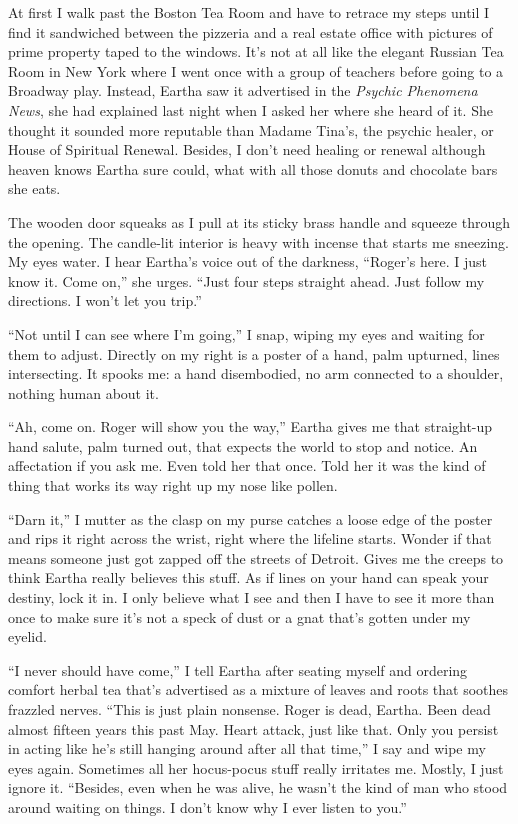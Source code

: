 \documentclass[twoside,10pt]{book}
\begin{document}
At first I walk past the Boston Tea Room and have to retrace my steps
until I find it sand­wiched between the pizzeria and a real estate
office with pictures of prime property taped to the win­dows. It's not
at all like the elegant Russian Tea Room in New York where I went once
with a group of teachers before going to a Broadway play. Instead,
Eartha saw it advertised in the \emph{Psychic Phenomena News}, she had
explained last night when I asked her where she heard of it. She thought
it sounded more reputable than Madame Tina's, the psychic healer, or
House of Spiritual Renewal. Besides, I don't need healing or renewal
although heaven knows Eartha sure could, what with all those donuts and
chocolate bars she eats.

The wooden door squeaks as I pull at its sticky brass handle and squeeze
through the opening. The candle-lit interior is heavy with incense that
starts me sneezing. My eyes water. I hear Eartha's voice out of the
darkness, ``Roger's here. I just know it. Come on,'' she urges. ``Just
four steps straight ahead. Just follow my directions. I won't let you
trip.''

``Not until I can see where I'm going,'' I snap, wiping my eyes and
waiting for them to adjust. Directly on my right is a poster of a hand,
palm upturned, lines intersecting. It spooks me: a hand dis­embodied, no
arm connected to a shoulder, nothing human about it.

``Ah, come on. Roger will show you the way,'' Eartha gives me that
straight-up hand salute, palm turned out, that expects the world to stop
and notice. An affectation if you ask me. Even told her that once. Told
her it was the kind of thing that works its way right up my nose like
pollen.

``Darn it,'' I mutter as the clasp on my purse catches a loose edge of
the poster and rips it right across the wrist, right where the lifeline
starts. Wonder if that means someone just got zapped off the streets of
Detroit. Gives me the creeps to think Eartha really believes this stuff.
As if lines on your hand can speak your destiny, lock it in. I only
believe what I see and then I have to see it more than once to make sure
it's not a speck of dust or a gnat that's gotten under my eyelid.

``I never should have come,'' I tell Eartha after seating myself and
ordering comfort herbal tea that's advertised as a mixture of leaves and
roots that soothes frazzled nerves. ``This is just plain non­sense.
Roger is dead, Eartha. Been dead almost fifteen years this past May.
Heart attack, just like that. Only you persist in acting like he's still
hanging around after all that time,'' I say and wipe my eyes again.
Sometimes all her hocus-pocus stuff really irritates me. Mostly, I just
ignore it. ``Besides, even when he was alive, he wasn't the kind of man
who stood around waiting on things. I don't know why I ever listen to
you.''
\end{document}

